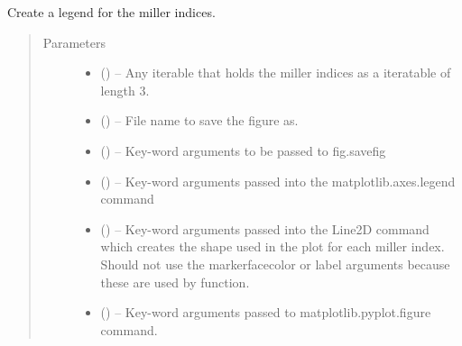 \documentclass[letterpaper,10pt,english,openany,oneside]{sphinxmanual}
\begin{document}
\begin{fulllineitems}
\label{\detokenize{index:ogre.utils.wulffmaker.miller_index_legend}}
Create a legend for the miller indices.
\begin{quote}\begin{description}
\item[{Parameters}] \leavevmode\begin{itemize}
\item {} 
 () -- Any iterable that holds the miller indices as a iteratable of length 3.

\item {} 
 () -- File name to save the figure as.

\item {} 
 () -- Key-word arguments to be passed to fig.savefig

\item {} 
 () -- Key-word arguments passed into the matplotlib.axes.legend command

\item {} 
 () -- Key-word arguments passed into the Line2D command which creates the
shape used in the plot for each miller index. Should not use the
markerfacecolor or label arguments because these are used by function.

\item {} 
 () -- Key-word arguments passed to matplotlib.pyplot.figure command.

\end{itemize}

\end{description}\end{quote}

\end{fulllineitems}




\renewcommand{\indexname}{Index}
\printindex
\end{document}
